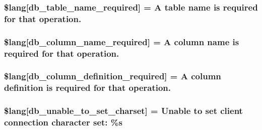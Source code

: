 \subsubsection[{\$lang}]{\setlength{\rightskip}{0pt plus 5cm}\$lang\mbox{[}\textquotesingle{}db\+\_\+table\+\_\+name\+\_\+required\textquotesingle{}\mbox{]} = \textquotesingle{}A table name is required {\bf for} that operation.\textquotesingle{}}\label{_admin_2system_2language_2english_2db__lang_8php_a2899cf8f7246d7fa97660ea52856ade5}
\hypertarget{_admin_2system_2language_2english_2db__lang_8php_ac87ab86a1f105d87327480b6d0659b13}{}
\subsubsection[{\$lang}]{\setlength{\rightskip}{0pt plus 5cm}\$lang\mbox{[}\textquotesingle{}db\+\_\+column\+\_\+name\+\_\+required\textquotesingle{}\mbox{]} = \textquotesingle{}A column name is required {\bf for} that operation.\textquotesingle{}}\label{_admin_2system_2language_2english_2db__lang_8php_ac87ab86a1f105d87327480b6d0659b13}
\hypertarget{_admin_2system_2language_2english_2db__lang_8php_ad0ba270704ec81f8f89e486a18660354}{}
\subsubsection[{\$lang}]{\setlength{\rightskip}{0pt plus 5cm}\$lang\mbox{[}\textquotesingle{}db\+\_\+column\+\_\+definition\+\_\+required\textquotesingle{}\mbox{]} = \textquotesingle{}A column definition is required {\bf for} that operation.\textquotesingle{}}\label{_admin_2system_2language_2english_2db__lang_8php_ad0ba270704ec81f8f89e486a18660354}
\hypertarget{_admin_2system_2language_2english_2db__lang_8php_ab22396948e25460833329cb8786ad831}{}
\subsubsection[{\$lang}]{\setlength{\rightskip}{0pt plus 5cm}\$lang\mbox{[}\textquotesingle{}db\+\_\+unable\+\_\+to\+\_\+set\+\_\+charset\textquotesingle{}\mbox{]} = \textquotesingle{}Unable to set client connection character set\+: \%s\textquotesingle{}}\label{_admin_2system_2language_2english_2db__lang_8php_ab22396948e25460833329cb8786ad831}
\hypertarget{_admin_2system_2language_2english_2db__lang_8php_a4be34cea2490b0d41689b65e52286658}{}
